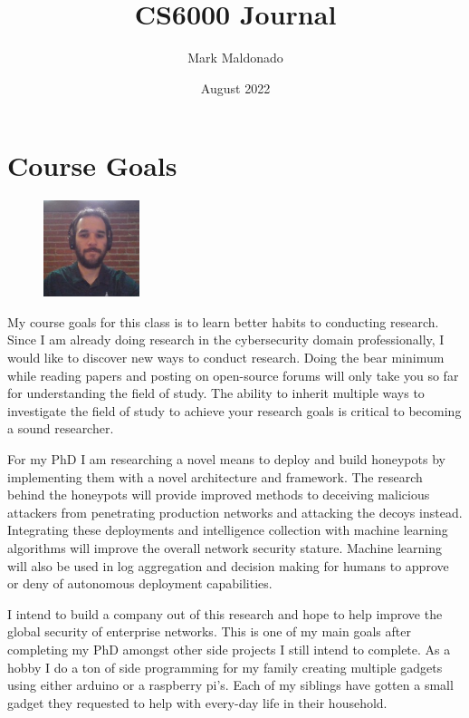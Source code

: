 \documentclass[journal]{IEEEtran}
\title{CS6000 \nth{1} Journal}
\author{Mark Maldonado}
\date{August 2022}
\begin{document}
    \maketitle

    \section{Course Goals}
    \label{sec:Goals}
        \begin{figure}
            \centering
            \includegraphics[width=0.25\textwidth]{images/maldonado_profile.jpg}
        \end{figure}
        My course goals for this class is to learn better habits to conducting research.
        Since I am already doing research in the cybersecurity domain professionally, I would like to discover new ways to conduct research.
        Doing the bear minimum while reading papers and posting on open-source forums will only take you so far for understanding the field of study.
        The ability to inherit multiple ways to investigate the field of study to achieve your research goals is critical to becoming a sound researcher.

        For my PhD I am researching a novel means to deploy and build honeypots by implementing them with a novel architecture and framework.
        The research behind the honeypots will provide improved methods to deceiving malicious attackers from penetrating production networks and attacking the decoys instead.
        Integrating these deployments and intelligence collection with machine learning algorithms will improve the overall network security stature.
        Machine learning will also be used in log aggregation and decision making for humans to approve or deny of autonomous deployment capabilities.

        I intend to build a company out of this research and hope to help improve the global security of enterprise networks.
        This is one of my main goals after completing my PhD amongst other side projects I still intend to complete.
        As a hobby I do a ton of side programming for my family creating multiple gadgets using either arduino or a raspberry pi's.
        Each of my siblings have gotten a small gadget they requested to help with every-day life in their household.
\end{document}
